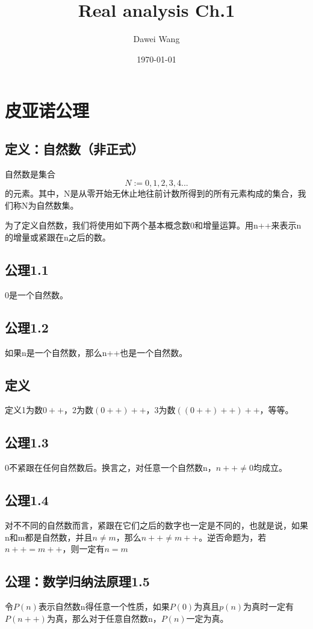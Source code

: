 \documentclass{article}
\title{Real analysis Ch.1}
\author{Dawei Wang}
\date{\today}
\begin{document}
	\maketitle
\section{皮亚诺公理}
\subsection{定义：自然数（非正式）}
自然数是集合
\[
N:={0,1,2,3,4...}
\]
的元素。其中，N是从零开始无休止地往前计数所得到的所有元素构成的集合，我们称N为自然数集。
\\ \hspace*{\fill}

为了定义自然数，我们将使用如下两个基本概念数0和增量运算。用n++来表示n的增量或紧跟在n之后的数。
\subsection{公理1.1}
0是一个自然数。

\subsection{公理1.2}
如果n是一个自然数，那么n++也是一个自然数。

\subsection{定义}
定义1为数$0++$，2为数$ (0++)++ $，3为数$ ((0++)++)++ $，等等。

\subsection{公理1.3}
0不紧跟在任何自然数后。换言之，对任意一个自然数n，$ n++\ne 0 $均成立。

\subsection{公理1.4}
对不不同的自然数而言，紧跟在它们之后的数字也一定是不同的，也就是说，如果n和m都是自然数，并且$ n\ne m $，那么$ n++\ne m++ $。逆否命题为，若$ n++=m++ $，则一定有$ n=m $

\subsection{公理：数学归纳法原理1.5}
令$ P(n) $表示自然数n得任意一个性质，如果$ P(0) $为真且$ p(n) $为真时一定有$ P(n++) $为真，那么对于任意自然数n，$ P(n) $一定为真。
\end{document}
